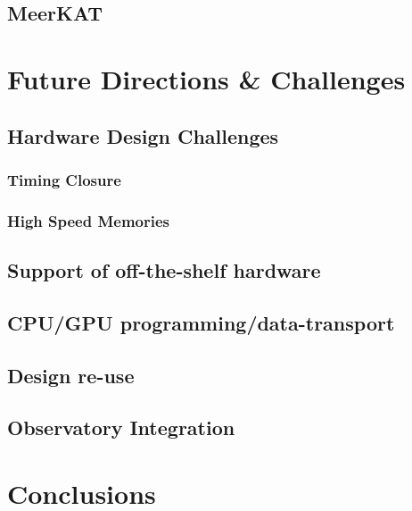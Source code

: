 \documentclass{ws-jai}
\begin{document}
\subsection{MeerKAT}


\section{Future Directions \& Challenges} \label{sec:Future}

\subsection{Hardware Design Challenges}

\subsubsection{Timing Closure}

\subsubsection{High Speed Memories} \label{sec: HSM}


\subsection{Support of off-the-shelf hardware}

\subsection{CPU/GPU programming/data-transport}

\subsection{Design re-use}

\subsection{Observatory Integration}


\section{Conclusions} \label{sec:Conclusions}





\end{document}

